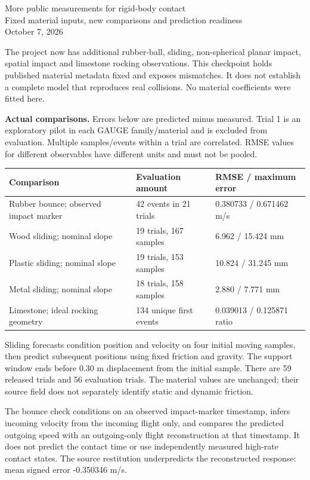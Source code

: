\documentclass[10pt,a4paper]{article}
\begin{document}
\begin{center}{\Large More public measurements for rigid-body contact}\\[5pt]
{Fixed material inputs, new comparisons and prediction readiness}\\[4pt]
October 7, 2026\end{center}

The project now has additional rubber-ball, sliding, non-spherical planar impact,
spatial impact and limestone rocking observations. This checkpoint holds published
material metadata fixed and exposes mismatches. It does not establish a complete
model that reproduces real collisions. No material coefficients were fitted here.

\textbf{Actual comparisons.} Errors below are predicted minus measured. Trial 1 is
an exploratory pilot in each GAUGE family/material and is excluded from evaluation.
Multiple samples/events within a trial are correlated. RMSE values for different
observables have different units and must not be pooled.

\begin{center}\small
\begin{tabular}{p{54mm}p{37mm}p{39mm}}\hline
Comparison & Evaluation amount & RMSE / maximum error\\\hline
Rubber bounce; observed impact marker & 42 events in 21 trials & 0.380733 / 0.671462 m/s\\
Wood sliding; nominal slope & 19 trials, 167 samples & 6.962 / 15.424 mm\\
Plastic sliding; nominal slope & 19 trials, 153 samples & 10.824 / 31.245 mm\\
Metal sliding; nominal slope & 18 trials, 158 samples & 2.880 / 7.771 mm\\
Limestone; ideal rocking geometry & 134 unique first events & 0.039013 / 0.125871 ratio\\\hline
\end{tabular}\end{center}

Sliding forecasts condition position and velocity on four initial moving samples,
then predict subsequent positions using fixed friction and gravity. The support
window ends before 0.30 m displacement from the initial sample. There are 59
released trials and 56 evaluation trials. The material values are unchanged;
their source field does not separately identify static and dynamic friction.

The bounce check conditions on an observed impact-marker timestamp, infers
incoming velocity from the incoming flight only, and compares the predicted
outgoing speed with an outgoing-only flight reconstruction at that timestamp.
It does not predict the contact time or use independently measured high-rate
contact states. The source restitution underpredicts the reconstructed response:
mean signed error -0.350346 m/s.
\end{document}
